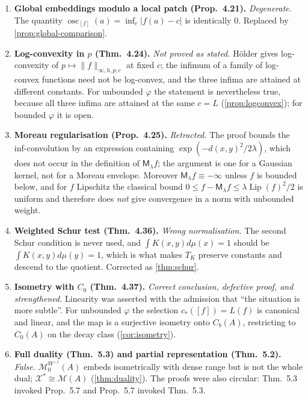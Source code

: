\documentclass[11pt,a4paper]{article}
\numberwithin{equation}{section}
\theoremstyle{plain}
\theoremstyle{definition}
\theoremstyle{remark}
\newcommand{\Cb}{C_b}
\newcommand{\Cz}{C_0}
\newcommand{\Msp}{\mathcal{M}}
\newcommand{\Xdec}{\mathcal{X}}
\DeclareMathOperator{\osc}{osc}
\DeclareMathOperator{\Lip}{Lip}
\begin{document}
\begin{enumerate}
\item \textbf{Global embeddings modulo a local patch (Prop.~4.21).} \emph{Degenerate.}
The quantity $\osc_{[f]}(a)=\inf_c|f(a)-c|$ is identically $0$. Replaced by
\cref{prop:global-comparison}.

\item \textbf{Log-convexity in $p$ (Thm.~4.24).} \emph{Not proved as stated.} H\"older
gives log-convexity of $p\mapsto\|f\|_{\infty,h,p;c}$ at fixed $c$; the infimum of a family
of log-convex functions need not be log-convex, and the three infima are attained at
different constants. For unbounded $\varphi$ the statement is nevertheless true, because
all three infima are attained at the same $c=L$ (\cref{prop:logconvex}); for bounded
$\varphi$ it is open.

\item \textbf{Moreau regularisation (Prop.~4.25).} \emph{Retracted.} The proof bounds the
inf-convolution by an expression containing $\exp(-d(x,y)^{2}/2\lambda)$, which does not
occur in the definition of $\mathsf{M}_\lambda f$; the argument is one for a Gaussian
kernel, not for a Moreau envelope. Moreover $\mathsf{M}_\lambda f\equiv-\infty$ unless $f$
is bounded below, and for $f$ Lipschitz the classical bound
$0\le f-\mathsf{M}_\lambda f\le\lambda\Lip(f)^{2}/2$ is uniform and therefore does
\emph{not} give convergence in a norm with unbounded weight.

\item \textbf{Weighted Schur test (Thm.~4.36).} \emph{Wrong normalisation.} The second
Schur condition is never used, and $\int K(x,y)d\mu(x)=1$ should be
$\int K(x,y)d\mu(y)=1$, which is what makes $T_K$ preserve constants and descend to the
quotient. Corrected as \cref{thm:schur}.

\item \textbf{Isometry with $\Cz$ (Thm.~4.37).} \emph{Correct conclusion, defective proof,
and strengthened.} Linearity was asserted with the admission that ``the situation is more
subtle''. For unbounded $\varphi$ the selection $c_\ast([f])=L(f)$ is canonical and linear,
and the map is a surjective isometry onto $\Cb(A)$, restricting to $\Cz(A)$ on the decay
class (\cref{cor:isometry}).

\item \textbf{Full duality (Thm.~5.3) and partial representation (Thm.~5.2).}
\emph{False.} $\Msp_0^{W^{-1}}(A)$ embeds isometrically with dense range but is not the
whole dual; $\Xdec^{\ast}\cong\Msp(A)$ (\cref{thm:duality}). The proofs were also
circular: Thm.~5.3 invoked Prop.~5.7 and Prop.~5.7 invoked Thm.~5.3.


\end{enumerate}
\end{document}
